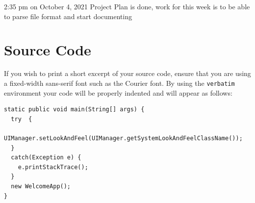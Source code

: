 \documentclass[]{final_report}
\begin{document}
2:35 pm on October 4, 2021  
Project Plan is done, work for this week is to be able to parse file format and start documenting

\section{Source Code}

If you wish to print a short excerpt of your source code,  ensure that you are using a fixed-width sans-serif font such as the Courier font. By using the \verb|verbatim| environment your code will be properly indented and will appear as follows:

\begin{verbatim}
static public void main(String[] args) {
  try  {
    UIManager.setLookAndFeel(UIManager.getSystemLookAndFeelClassName());
  }
  catch(Exception e) {
    e.printStackTrace();
  }
  new WelcomeApp();
} 
\end{verbatim}
\newpage
\end{document}
